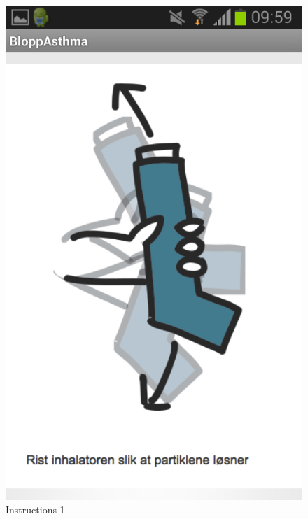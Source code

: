 \begin{figure}[H]
	\begin{minipage}[b]{0.3\linewidth}
		\centering
		\includegraphics[width=0.20\paperwidth]{Pictures/app-screenshots/instructions-1.png}
		\caption{Instructions 1}
		\label{fig:instructions-1}
	\end{minipage}
	\begin{minipage}[b]{0.3\linewidth}
		\centering

\end{minipage}
\end{figure}
